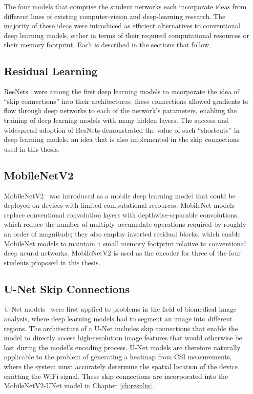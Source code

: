 The four models that comprise the student networks each incorporate ideas from different lines of
existing computer-vision and deep-learning research. The majority of these ideas were introduced as
efficient alternatives to conventional deep learning models, either in terms of their required
computational resources or their memory footprint. Each is described in the sections that follow.

\subsection{Residual Learning}
\label{sec:lit:resnet}

ResNets~\cite{he2016resnet} were among the first deep learning models to incorporate the idea of ``skip
connections'' into their architectures; these connections allowed gradients to flow through deep
networks to each of the network's parameters, enabling the training of deep learning models with many
hidden layers. The success and widespread adoption of ResNets demonstrated the value of such
``shortcuts'' in deep learning models, an idea that is also implemented in the skip connections used in
this thesis.

\subsection{MobileNetV2}
\label{sec:lit:mobilenet}

MobileNetV2~\cite{sandler2018mobilenetv2} was introduced as a mobile deep learning model that could be
deployed on devices with limited computational resources. MobileNet models replace conventional
convolution layers with depthwise-separable convolutions, which reduce the number of multiply--accumulate
operations required by roughly an order of magnitude; they also employ inverted residual blocks, which
enable MobileNet models to maintain a small memory footprint relative to conventional deep neural
networks. MobileNetV2 is used as the encoder for three of the four students proposed in this thesis.

\subsection{U-Net Skip Connections}
\label{sec:lit:unet}

U-Net models~\cite{ronneberger2015unet} were first applied to problems in the field of biomedical image
analysis, where deep learning models had to segment an image into different regions. The architecture of
a U-Net includes skip connections that enable the model to directly access high-resolution image
features that would otherwise be lost during the model's encoding process. U-Net models are therefore
naturally applicable to the problem of generating a heatmap from CSI measurements, where the system must
accurately determine the spatial location of the device emitting the WiFi signal. These skip connections
are incorporated into the MobileNetV2-UNet model in Chapter~\ref{ch:results}.


